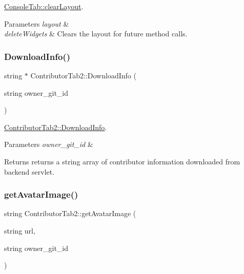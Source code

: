 \hyperlink{classConsoleTab_aae70e23b23e401b219edefcac4882eaf}{Console\+Tab\+::clear\+Layout}. 


\begin{DoxyParams}{Parameters}
{\em layout} & \\
\hline
{\em delete\+Widgets} & Clears the layout for future method calls. \\
\hline
\end{DoxyParams}
\mbox{\label{classContributorTab2_a5b9c63b5497b9e095624cd01969f0101}} 
\subsubsection{\texorpdfstring{Download\+Info()}{DownloadInfo()}}
{\footnotesize\ttfamily string $\ast$ Contributor\+Tab2\+::\+Download\+Info (\begin{DoxyParamCaption}\item[{string}]{owner\+\_\+git\+\_\+id }\end{DoxyParamCaption})}



\hyperlink{classContributorTab2_a5b9c63b5497b9e095624cd01969f0101}{Contributor\+Tab2\+::\+Download\+Info}. 


\begin{DoxyParams}{Parameters}
{\em owner\+\_\+git\+\_\+id} & \\
\hline
\end{DoxyParams}
\begin{DoxyReturn}{Returns}
returns a string array of contributor information downloaded from backend servlet. 
\end{DoxyReturn}
\mbox{\label{classContributorTab2_aed6aceb6bd6c0fb3d32e435a731133d8}} 
\subsubsection{\texorpdfstring{get\+Avatar\+Image()}{getAvatarImage()}}
{\footnotesize\ttfamily string Contributor\+Tab2\+::get\+Avatar\+Image (\begin{DoxyParamCaption}\item[{string}]{url,  }\item[{string}]{owner\+\_\+git\+\_\+id }\end{DoxyParamCaption})}



